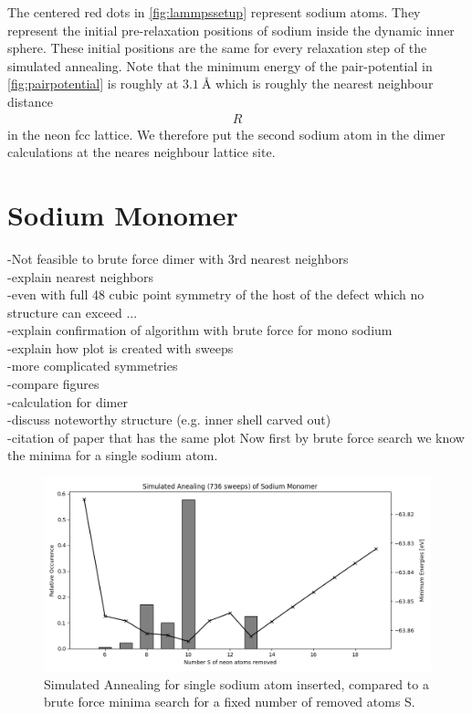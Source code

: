 The centered red dots in \ref{fig:lammpssetup} represent sodium atoms. They represent the initial pre-relaxation positions of sodium inside the dynamic inner sphere. These initial positions are the same for every relaxation step of the simulated annealing. Note that the minimum energy of the pair-potential in \ref{fig:pairpotential} is roughly at $\SI{3.1}{\angstrom}$ which is roughly the nearest neighbour distance 
\begin{align}
	R
\end{align} in the neon \ac{fcc} lattice. We therefore put the second sodium atom in the dimer calculations at the neares neighbour lattice site. 
\section{Sodium Monomer}
-Not feasible to brute force dimer with 3rd nearest neighbors\\
-explain nearest neighbors\\
-even with full 48 cubic point symmetry of the host of the defect which no structure can exceed ...\\ 
-explain confirmation of algorithm with brute force for mono sodium\\
-explain how plot is created with sweeps\\
-more complicated symmetries\\
-compare figures\\
-calculation for dimer\\
-discuss noteworthy structure (e.g. inner shell carved out)\\
-citation of paper that has the same plot
Now first by brute force search we know the minima for a single sodium atom.


\begin{figure}[h!]
	\centering
	\includegraphics[scale=0.5]{./Inhalt/Bilder/optimal_defect_simulated_annealing.png}
	\caption{Simulated Annealing for single sodium atom inserted, compared to a brute force minima search for a fixed number of removed atoms S.}
	\label{fig:simulatedannealingsodium}
\end{figure}  

